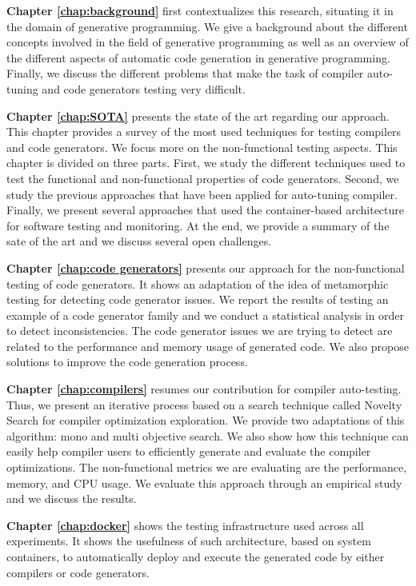 \textbf{Chapter \ref{chap:background}} first contextualizes this research, situating it in the domain of generative programming. We give a background about the different concepts involved in the field of generative programming as well as an overview of the different aspects of automatic code generation in generative programming. Finally, we discuss the different problems that make the task of compiler auto-tuning and code generators testing very difficult.

\textbf{Chapter \ref{chap:SOTA}} presents the state of the art regarding our approach. This chapter provides a survey of the most used techniques for testing compilers and code generators. We focus more on the non-functional testing aspects.
This chapter is divided on three parts. First, we study the different techniques used to test the functional and non-functional properties of code generators. Second, we study the previous approaches that have been applied for auto-tuning compiler. Finally, we present several approaches that used the container-based architecture for software testing and monitoring. At the end, we provide a summary of the sate of the art and we discuss several open challenges.

\textbf{Chapter \ref{chap:code generators}} presents our approach for the non-functional testing of code generators. It shows an adaptation of the idea of metamorphic testing for detecting code generator issues. We report the results of testing an example of a code generator family and we conduct a statistical analysis in order to detect inconsistencies. The code generator issues we are trying to detect are related to the performance and memory usage of generated code. We also  propose solutions to improve the code generation process.

\textbf{Chapter \ref{chap:compilers}} resumes our contribution for compiler auto-testing. Thus, we present an iterative process based on a search technique called Novelty Search for compiler optimization exploration. We provide two adaptations of this algorithm: mono and multi objective search. We also show how this technique can easily help compiler users to efficiently generate and evaluate the compiler optimizations. The non-functional metrics we are evaluating are the performance, memory, and CPU usage. We evaluate this approach through an empirical study and we discuss the results.

\textbf{Chapter \ref{chap:docker}} shows the testing infrastructure used across all experiments. It shows the usefulness of such architecture, based on system containers, to automatically deploy and execute the generated code by either compilers or code generators. 

